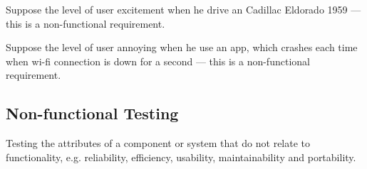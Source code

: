 Suppose the level of user excitement when he drive an Cadillac Eldorado 1959 — this is a non-functional requirement.

Suppose the level of user annoying when he use an app, which crashes each time when wi-fi connection is down for a second — this is a non-functional requirement.

\subsection{Non-functional Testing}
\label{sec:Non-functional Testing}

Testing the attributes of a component or system that do not relate to functionality, e.g. reliability, efficiency, usability, maintainability and portability.
